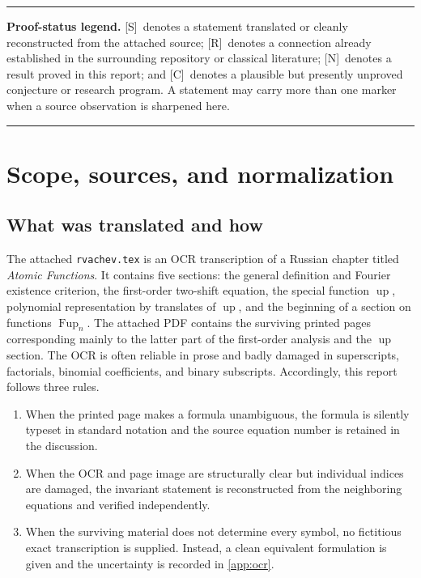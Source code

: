 \documentclass[11pt,oneside]{article}
\theoremstyle{definition}
\theoremstyle{remark}
\newcommand{\Up}{\operatorname{up}}
\newcommand{\Smark}{\textcolor{sourceblue}{\textsf{[S]}}}
\newcommand{\Rmark}{\textcolor{sourceblue}{\textsf{[R]}}}
\newcommand{\Nmark}{\textcolor{newgreen}{\textsf{[N]}}}
\newcommand{\Cmark}{\textcolor{conjecturered}{\textsf{[C]}}}
\newenvironment{boxedremark}{%
  \par\smallskip\noindent\begin{center}\begin{minipage}{0.94\textwidth}%
  \color{black}\hrule\vspace{0.6em}\small
}{%
  \vspace{0.6em}\hrule\end{minipage}\end{center}\smallskip
}
\begin{document}
\begin{boxedremark}
\textbf{Proof-status legend.}
\Smark\ denotes a statement translated or cleanly reconstructed from the attached source;
\Rmark\ denotes a connection already established in the surrounding repository or classical literature;
\Nmark\ denotes a result proved in this report; and
\Cmark\ denotes a plausible but presently unproved conjecture or research program.  A statement may carry more than one marker when a source observation is sharpened here.
\end{boxedremark}

\tableofcontents
\newpage

\section{Scope, sources, and normalization}
\label{sec:scope}

\subsection{What was translated and how}

The attached \texttt{rvachev.tex} is an OCR transcription of a Russian chapter titled
\emph{Atomic Functions}.  It contains five sections: the general definition and Fourier
existence criterion, the first-order two-shift equation, the special function $\Up$, polynomial
representation by translates of $\Up$, and the beginning of a section on functions
$\operatorname{Fup}_n$.  The attached PDF contains the surviving printed pages corresponding
mainly to the latter part of the first-order analysis and the $\Up$ section.  The OCR is often
reliable in prose and badly damaged in superscripts, factorials, binomial coefficients, and
binary subscripts.  Accordingly, this report follows three rules.

\begin{enumerate}
\item When the printed page makes a formula unambiguous, the formula is silently typeset in
      standard notation and the source equation number is retained in the discussion.
\item When the OCR and page image are structurally clear but individual indices are damaged,
      the invariant statement is reconstructed from the neighboring equations and verified
      independently.
\item When the surviving material does not determine every symbol, no fictitious exact
      transcription is supplied.  Instead, a clean equivalent formulation is given and the
      uncertainty is recorded in \cref{app:ocr}.
\end{enumerate}
\end{document}
